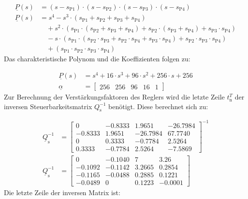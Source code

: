 \begin{align*}
    \underline{P}(s) &= (s-s_{\mathrm{P1}})\cdot(s-s_{\mathrm{P2}})\cdot(s-s_{\mathrm{P3}})\cdot(s-s_{\mathrm{P4}}) \\
    \underline{P}(s) &= s^4-s^3\cdot(s_{\mathrm{P1}}+s_{\mathrm{P2}}+s_{\mathrm{P3}}+s_{\mathrm{P4}}) \nonumber \\ 
    &\quad +s^2\cdot(s_{\mathrm{P1}}\cdot(s_{\mathrm{P2}}+s_{\mathrm{P3}}+s_{\mathrm{P4}})+s_{\mathrm{P2}}\cdot(s_{\mathrm{P3}}+s_{\mathrm{P4}})+s_{\mathrm{P3}}\cdot s_{\mathrm{P4}}) \nonumber \\
    &\quad -s\cdot(s_{\mathrm{P1}}\cdot(s_{\mathrm{P2}}\cdot s_{\mathrm{P3}}+s_{\mathrm{P2}}\cdot s_{\mathrm{P4}}+s_{\mathrm{P3}}\cdot s_{\mathrm{P4}})+s_{\mathrm{P2}}\cdot s_{\mathrm{P3}}\cdot s_{\mathrm{P4}}) \nonumber \\
    &\quad +(s_{\mathrm{P1}}\cdot s_{\mathrm{P2}}\cdot s_{\mathrm{P3}}\cdot s_{\mathrm{P4}})
\end{align*}
\newline
Das charakteristische Polynom und die Koeffizienten folgen zu:

\begin{align}
    \underline{P}(s) &= s^4+16\cdot s^3+96\cdot s^2+256\cdot s+256 \nonumber \\
    \underline{\alpha} &=
    \begin{bmatrix}
        256 & 256 & 96 & 16 & 1
    \end{bmatrix} \label{eq:Gleichung38}
\end{align}
\newline
Zur Berechnung der Verstärkungsfaktoren des Reglers wird die letzte Zeile $t_{\mathrm{n}}^T$ der inversen Steuerbarkeitsmatrix $Q_{\mathrm{s}}^{-1}$ benötigt. Diese berechnet sich zu:

\begin{align*}
    \underline{Q}_{\mathrm{s}}^{-1} &=
    \begin{bmatrix}
         0 & -0.8333 & 1.9651 & -26.7984 \\
        -0.8333 & 1.9651 & -26.7984 & 67.7740 \\
        0 & 0.3333 & -0.7784 & 2.5264 \\
        0.3333 & -0.7784 & 2.5264 & -7.5869
    \end{bmatrix}^{-1} \\
    \underline{Q}_{\mathrm{s}}^{-1} &=
    \begin{bmatrix}
        0 & -0.1040 & 7 & 3.26 \\
        -0.1092 & -0.1142 & 3.2665 & 0.2854 \\
        -0.1165 & -0.0488 & 0.2885 & 0.1221 \\
        -0.0489 & 0 & 0.1223 & -0.0001
    \end{bmatrix}
\end{align*}
\newline
Die letzte Zeile der inversen Matrix ist:

